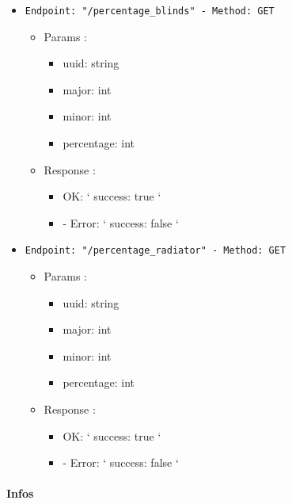 \begin{itemize}
  \item \texttt{Endpoint: "/percentage_blinds" -  Method: GET}
  \begin{itemize} 
    \item Params :
    \begin{itemize}
      \item uuid: string
      \item major: int
      \item minor: int
      \item percentage: int
    \end{itemize}

    \item Response : 
    \begin{itemize}
      \item  OK: `{ success: true }`
      \item - Error: `{ success: false }`
    \end{itemize}
  \end{itemize}
\end{itemize}

\begin{itemize}
  \item \texttt{Endpoint: "/percentage_radiator" -  Method: GET}
  \begin{itemize} 
    \item Params :
    \begin{itemize}
      \item uuid: string
      \item major: int
      \item minor: int
      \item percentage: int
    \end{itemize}

    \item Response : 
    \begin{itemize}
      \item  OK: `{ success: true }`
      \item - Error: `{ success: false }`
    \end{itemize}
  \end{itemize}
\end{itemize}


\paragraph{Infos}

